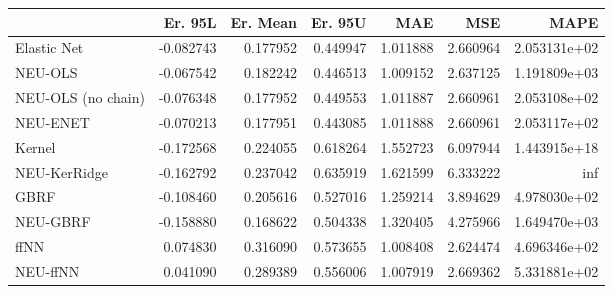\begin{tabular}{lrrrrrr}
\toprule
{} &   Er. 95L &  Er. Mean &   Er. 95U &       MAE &       MSE &          MAPE \\
\midrule
Elastic Net        & -0.082743 &  0.177952 &  0.449947 &  1.011888 &  2.660964 &  2.053131e+02 \\
NEU-OLS            & -0.067542 &  0.182242 &  0.446513 &  1.009152 &  2.637125 &  1.191809e+03 \\
NEU-OLS (no chain) & -0.076348 &  0.177952 &  0.449553 &  1.011887 &  2.660961 &  2.053108e+02 \\
NEU-ENET           & -0.070213 &  0.177951 &  0.443085 &  1.011888 &  2.660961 &  2.053117e+02 \\
Kernel             & -0.172568 &  0.224055 &  0.618264 &  1.552723 &  6.097944 &  1.443915e+18 \\
NEU-KerRidge       & -0.162792 &  0.237042 &  0.635919 &  1.621599 &  6.333222 &           inf \\
GBRF               & -0.108460 &  0.205616 &  0.527016 &  1.259214 &  3.894629 &  4.978030e+02 \\
NEU-GBRF           & -0.158880 &  0.168622 &  0.504338 &  1.320405 &  4.275966 &  1.649470e+03 \\
ffNN               &  0.074830 &  0.316090 &  0.573655 &  1.008408 &  2.624474 &  4.696346e+02 \\
NEU-ffNN           &  0.041090 &  0.289389 &  0.556006 &  1.007919 &  2.669362 &  5.331881e+02 \\
\bottomrule
\end{tabular}
